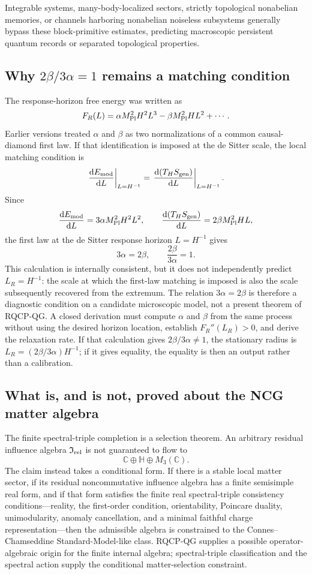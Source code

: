 \documentclass[11pt]{article}
\newcommand{\I}{\mathfrak I}
\newcommand{\diff}{\mathrm d}
\begin{document}
Integrable systems, many-body-localized sectors, strictly topological nonabelian memories, or channels harboring nonabelian noiseless subsystems generally bypass these block-primitive estimates, predicting macroscopic persistent quantum records or separated topological properties.

\subsection{\texorpdfstring{Why $2\beta/3\alpha=1$ remains a matching condition}{Why 2 beta / 3 alpha = 1 remains a matching condition}}

The response-horizon free energy was written as
\[
F_R(L)=\alpha M_{\rm Pl}^2H^2L^3-\beta M_{\rm Pl}^2HL^2+\cdots .
\]
Earlier versions treated $\alpha$ and $\beta$ as two normalizations of a
common causal-diamond first law.  If that identification is imposed at the
de Sitter scale, the local matching condition is
\[
\left.\frac{\diff E_{\rm mod}}{\diff L}\right|_{L=H^{-1}}
=
\left.\frac{\diff (T_HS_{\rm gen})}{\diff L}\right|_{L=H^{-1}}.
\]
Since
\[
\frac{\diff E_{\rm mod}}{\diff L}=3\alpha M_{\rm Pl}^2H^2L^2,
\qquad
\frac{\diff(T_HS_{\rm gen})}{\diff L}=2\beta M_{\rm Pl}^2HL,
\]
the first law at the de Sitter response horizon $L=H^{-1}$ gives
\[
3\alpha=2\beta,
\qquad
\frac{2\beta}{3\alpha}=1.
\]
This calculation is internally consistent, but it does not independently
predict $L_R=H^{-1}$: the scale at which the first-law matching is imposed is
also the scale subsequently recovered from the extremum.  The relation
$3\alpha=2\beta$ is therefore a diagnostic condition on a candidate
microscopic model, not a present theorem of RQCP-QG.  A closed derivation must
compute $\alpha$ and $\beta$ from the same process without using the desired
horizon location, establish $F_R''(L_R)>0$, and derive the relaxation rate.
If that calculation gives $2\beta/3\alpha\ne1$, the stationary radius is
$L_R=(2\beta/3\alpha)H^{-1}$; if it gives equality, the equality is then an
output rather than a calibration.

\subsection{What is, and is not, proved about the NCG matter algebra}

The finite spectral-triple completion is a selection theorem.  An arbitrary
residual influence algebra $\I_{\rm rel}$ is not guaranteed to flow to
\[
\mathbb C\oplus\mathbb H\oplus M_3(\mathbb C).
\]
The claim instead takes a conditional form.  If there is a stable local
matter sector, if its residual noncommutative influence algebra has a finite
semisimple real form, and if that form satisfies the finite real
spectral-triple consistency conditions---reality, the first-order condition,
orientability, Poincare duality, unimodularity, anomaly cancellation, and a
minimal faithful charge representation---then the admissible algebra is
constrained to the Connes--Chamseddine Standard-Model-like class.  RQCP-QG
supplies a possible operator-algebraic origin for the finite internal
algebra; spectral-triple classification and the spectral action supply the
conditional matter-selection constraint.
\end{document}
